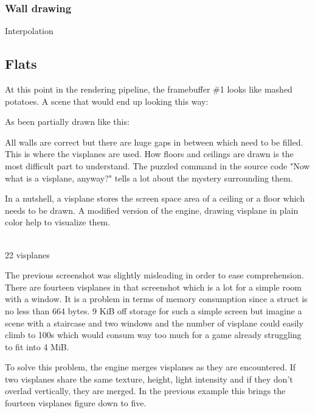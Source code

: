 \subsubsection{Wall drawing}
Interpolation













\subsection{Flats}
At this point in the rendering pipeline, the framebuffer \#1 looks like mashed potatoes. A scene that would end up looking this way:\\
\par
{}
\par
As been partially drawn like this:\\
\par

 All walls are correct but there are huge gaps in between which need to be filled. This is where the visplanes are used. How floors and ceilings are drawn is the most difficult part to understand. The puzzled command in the source code "Now what is a visplane, anyway?" tells a lot about the mystery surrounding them.\\
\par
{}
\par
In a nutshell, a visplane stores the screen space area of a ceiling or a floor which needs to be drawn. A modified version of the engine, drawing visplane in plain color help to visualize them.\\
\par
{}\\
 22 visplanes
\par
The previous screenshot was slightly misleading in order to ease comprehension. There are fourteen visplanes in that screenshot which is a lot for a simple room with a window. It is a problem in terms of memory consumption since a  struct is no less than 664 bytes. 9 KiB off storage for such a simple screen but imagine a scene with a staircase and two windows and the number of visplane could easily climb to 100s which would consum way too much for a game already struggling to fit into 4 MiB.\\
\par
To solve this problem, the engine merges visplanes as they are encountered. If two visplanes share the same texture, height, light intensity and if they don't overlad vertically, they are merged. In the previous example this brings the fourteen visplanes figure down to five.\\
\par
{}

